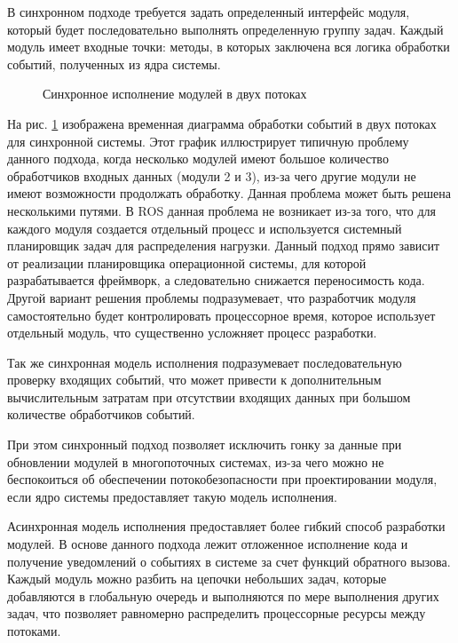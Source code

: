 
В синхронном подходе требуется задать определенный интерфейс модуля, который будет последовательно выполнять определенную группу задач. Каждый модуль имеет входные точки: методы, в которых заключена вся логика обработки событий, полученных из ядра системы.

\begin{figure}[h]
    \caption{Синхронное исполнение модулей в двух потоках}
    \label{im:2_1_1_sync}
\end{figure}

На рис. \ref{im:2_1_1_sync} изображена временная диаграмма обработки событий в двух потоках для синхронной системы. Этот график иллюстрирует типичную проблему данного подхода, когда несколько модулей имеют большое количество обработчиков входных данных (модули 2 и 3), из-за чего другие модули не имеют возможности продолжать обработку. Данная проблема может быть решена несколькими путями. В ROS данная проблема не возникает из-за того, что для каждого модуля создается отдельный процесс и используется системный планировщик задач для распределения нагрузки. Данный подход прямо зависит от реализации планировщика операционной системы, для которой разрабатывается фреймворк, а следовательно снижается переносимость кода. Другой вариант решения проблемы подразумевает, что разработчик модуля самостоятельно будет контролировать процессорное время, которое использует отдельный модуль, что существенно усложняет процесс разработки.

Так же синхронная модель исполнения подразумевает последовательную проверку входящих событий, что может привести к дополнительным вычислительным затратам при отсутствии входящих данных при большом количестве обработчиков событий.

При этом синхронный подход позволяет исключить гонку за данные 
при обновлении модулей в многопоточных системах, из-за чего 
можно не беспокоиться об обеспечении потокобезопасности при 
проектировании модуля, если ядро системы предоставляет такую 
модель исполнения.

Асинхронная модель исполнения предоставляет более гибкий способ разработки модулей. В основе данного подхода лежит отложенное исполнение кода и получение уведомлений о событиях в системе за счет функций обратного вызова. Каждый модуль можно разбить на цепочки небольших задач, которые добавляются в глобальную очередь и выполняются по мере выполнения других задач, что позволяет равномерно распределить процессорные ресурсы между потоками.

